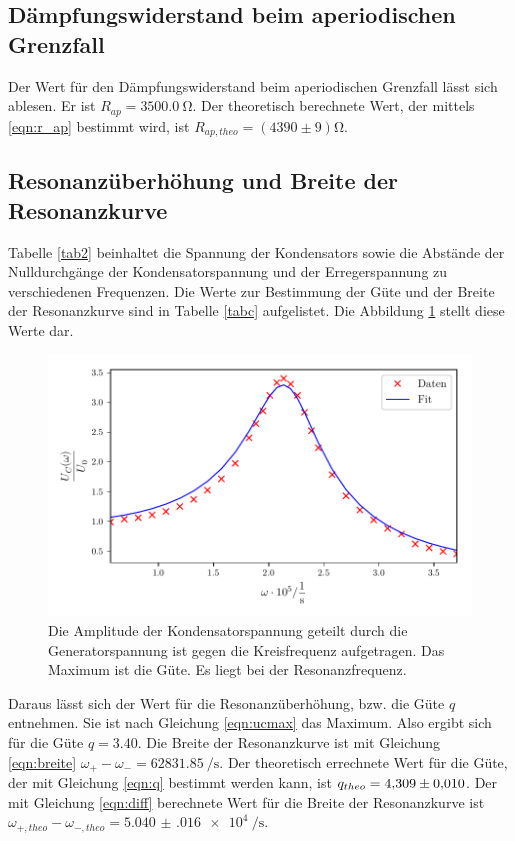 \subsection{Dämpfungswiderstand beim aperiodischen Grenzfall}
Der Wert für den Dämpfungswiderstand beim aperiodischen Grenzfall
lässt sich ablesen. Er ist $R_{ap} = \SI{3500.0}{\ohm}$.
\newline
Der theoretisch berechnete Wert, der mittels \eqref{eqn:r_ap}
bestimmt wird, ist $R_{ap,theo} = (4390 \pm 9) \si{\ohm}$.

\subsection{Resonanzüberhöhung und Breite der Resonanzkurve}
Tabelle \ref{tab2} beinhaltet die Spannung der Kondensators
sowie die Abstände der Nulldurchgänge der Kondensatorspannung
und der Erregerspannung zu verschiedenen Frequenzen.
Die Werte zur Bestimmung der Güte und der Breite der Resonanzkurve
sind in Tabelle \ref{tabc} aufgelistet.
Die Abbildung \ref{fig:plotc} stellt diese Werte dar.


\begin{figure}
  \centering
  \includegraphics{build/plotc.pdf}
  \caption{Die Amplitude der Kondensatorspannung geteilt durch die Generatorspannung
  ist gegen die Kreisfrequenz aufgetragen. Das Maximum ist die Güte. Es liegt bei der
  Resonanzfrequenz.}
  \label{fig:plotc}
\end{figure}
\noindent Daraus lässt sich der Wert für die Resonanzüberhöhung, bzw. die Güte $q$ entnehmen.
Sie ist nach Gleichung \eqref{eqn:ucmax} das Maximum.
Also ergibt sich für die Güte $q = \num{3.40}$.
Die Breite der Resonanzkurve ist mit Gleichung \eqref{eqn:breite}
$\omega_{+} - \omega_{-} = \SI[per-mode=fraction]{62831.85}{\per\second}$.
\newline
Der theoretisch errechnete Wert für die Güte, der mit Gleichung
\eqref{eqn:q} bestimmt werden kann, ist $q_{theo} = \num{4.309 \pm.010}$.
Der mit Gleichung \eqref{eqn:diff} berechnete Wert für die Breite der
Resonanzkurve ist
$\omega_{+,theo} - \omega_{-,theo} = \SI[per-mode=fraction]{5.040(016)e4}{\per\second}$.

